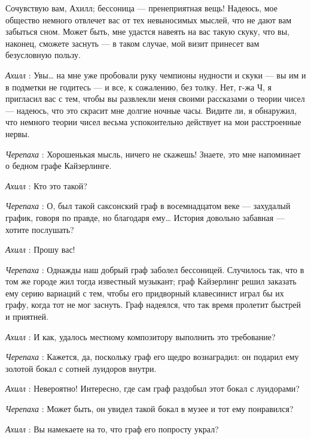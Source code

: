 \documentclass[../main.tex]{subfiles}
\begin{document}


\begin{dialogue}

 Сочувствую вам, Ахилл; бессоница --- пренеприятная вещь! Надеюсь, мое общество немного отвлечет вас от тех невыносимых мыслей, что не дают вам забыться сном. Может быть, мне удастся навеять на вас такую скуку, что вы, наконец, сможете заснуть --- в таком случае, мой визит принесет вам безусловную пользу.

\emph{Ахилл} : Увы\ldots{} на мне уже пробовали руку чемпионы нудности и скуки --- вы им и в подметки не годитесь --- и все, к сожалению, без толку. Нет, г-жа Ч, я пригласил вас с тем, чтобы вы развлекли меня своими рассказами о теории чисел --- надеюсь, что это скрасит мне долгие ночные часы. Видите ли, я обнаружил, что немного теории чисел весьма успокоительно действует на мои расстроенные нервы.

\emph{Черепаха} : Хорошенькая мысль, ничего не скажешь! Знаете, это мне напоминает о бедном графе Кайзерлинге.

\emph{Ахилл} : Кто это такой?

\emph{Черепаха} : О, был такой саксонский граф в восемнадцатом веке --- захудалый график, говоря по правде, но благодаря ему\ldots{} История довольно забавная --- хотите послушать?

\emph{Ахилл} : Прошу вас!

\emph{Черепаха} : Однажды наш добрый граф заболел бессоницей. Случилось так, что в том же городе жил тогда известный музыкант; граф Кайзерлинг решил заказать ему серию вариаций с тем, чтобы его придворный клавесинист играл бы их графу, когда тот не мог заснуть. Граф надеялся, что так время пролетит быстрей и приятней.

\emph{Ахилл} : И как, удалось местному композитору выполнить это требование?

\emph{Черепаха} : Кажется, да, поскольку граф его щедро вознаградил: он подарил ему золотой бокал с сотней луидоров внутри.

\emph{Ахилл} : Невероятно! Интересно, где сам граф раздобыл этот бокал с луидорами?

\emph{Черепаха} : Может быть, он увидел такой бокал в музее и тот ему понравился?

\emph{Ахилл} : Вы намекаете на то, что граф его попросту украл?


\end{dialogue}
\end{document}
